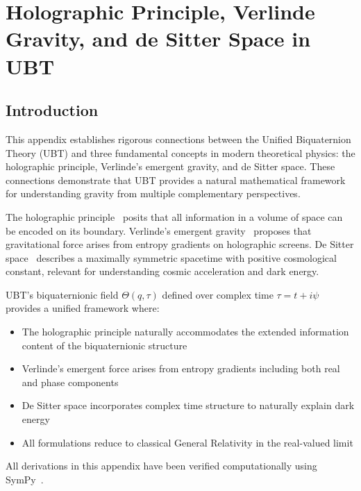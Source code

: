 
\section{Holographic Principle, Verlinde Gravity, and de Sitter Space in UBT}
\label{sec:holographic_verlinde_desitter}


\SpeculativeContentWarning

\subsection{Introduction}

This appendix establishes rigorous connections between the Unified Biquaternion Theory (UBT) and three fundamental concepts in modern theoretical physics: the holographic principle, Verlinde's emergent gravity, and de Sitter space. These connections demonstrate that UBT provides a natural mathematical framework for understanding gravity from multiple complementary perspectives.

The holographic principle~\cite{tHooft1993,Susskind1995} posits that all information in a volume of space can be encoded on its boundary. Verlinde's emergent gravity~\cite{Verlinde2011} proposes that gravitational force arises from entropy gradients on holographic screens. De Sitter space~\cite{deSitter1917} describes a maximally symmetric spacetime with positive cosmological constant, relevant for understanding cosmic acceleration and dark energy.

UBT's biquaternionic field $\Theta(q,\tau)$ defined over complex time $\tau = t + i\psi$ provides a unified framework where:
\begin{itemize}
\item The holographic principle naturally accommodates the extended information content of the biquaternionic structure
\item Verlinde's emergent force arises from entropy gradients including both real and phase components
\item De Sitter space incorporates complex time structure to naturally explain dark energy
\item All formulations reduce to classical General Relativity in the real-valued limit
\end{itemize}

All derivations in this appendix have been verified computationally using SymPy~\cite{SymPy2024}.

